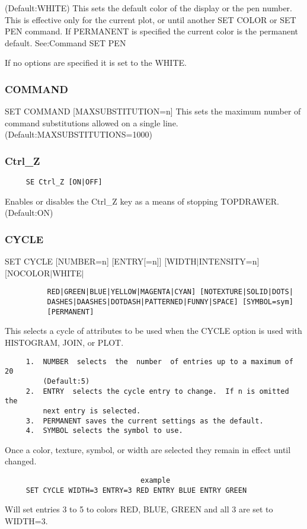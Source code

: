 (Default:WHITE)  This  sets the default color of the display or the pen
number.  This is effective only for the current plot, or until  another
SET  COLOR  or  SET PEN command.  If PERMANENT is specified the current
color is the permanent default.  See:Command SET PEN 

If no options are specified it is set to the WHITE.  
\subsubsection{COMMAND}
SET COMMAND [MAXSUBSTITUTION=n] 
This  sets  the  maximum  number  of command substitutions allowed on a
single line.  
(Default:MAXSUBSTITUTIONS=1000) 
\subsubsection{Ctrl\_Z}
\begin{verbatim}
     SE Ctrl_Z [ON|OFF] 
\end{verbatim}

Enables  or  disables  the Ctrl\_Z key as a means of stopping TOPDRAWER.
(Default:ON) 
\subsubsection{CYCLE}
SET CYCLE [NUMBER=n] [ENTRY[=n]] [WIDTH$|$INTENSITY=n] [NOCOLOR$|$WHITE$|$
\begin{verbatim}
          RED|GREEN|BLUE|YELLOW|MAGENTA|CYAN] [NOTEXTURE|SOLID|DOTS|
          DASHES|DAASHES|DOTDASH|PATTERNED|FUNNY|SPACE] [SYMBOL=sym]
          [PERMANENT] 
\end{verbatim}
This  selects a cycle of attributes to be used when the CYCLE option is
used with HISTOGRAM, JOIN, or PLOT.  
\begin{verbatim}
     1.  NUMBER  selects  the  number  of entries up to a maximum of 20
         (Default:5) 
     2.  ENTRY  selects the cycle entry to change.  If n is omitted the
         next entry is selected.  
     3.  PERMANENT saves the current settings as the default.  
     4.  SYMBOL selects the symbol to use.  
\end{verbatim}
Once  a  color,  texture,  symbol, or width are selected they remain in
effect until changed.  

\begin{verbatim}
                                example
     SET CYCLE WIDTH=3 ENTRY=3 RED ENTRY BLUE ENTRY GREEN 
\end{verbatim}
Will set entries 3 to 5 to colors RED, BLUE, GREEN and all 3 are set to
WIDTH=3.  

